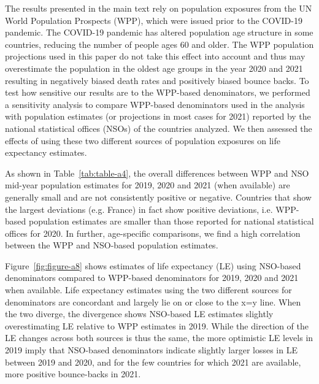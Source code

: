 \documentclass[12pt]{article}
\begin{document}
The results presented in the main text rely on population exposures from the UN World Population Prospects (WPP), which were issued prior to the COVID-19 pandemic. The COVID-19 pandemic has altered population age structure in some countries, reducing the number of people ages 60 and older. The WPP population projections used in this paper do not take this effect into account and thus may overestimate the population in the oldest age groups in the year 2020 and 2021 resulting in negatively biased death rates and positively biased bounce backs. To test how sensitive our results are to the WPP-based denominators, we performed a sensitivity analysis to compare WPP-based denominators used in the analysis with population estimates (or projections in most cases for 2021) reported by the national statistical offices (NSOs) of the countries analyzed. We then assessed the effects of using these two different sources of population exposures on life expectancy estimates.

As shown in Table~\ref{tab:table-a4}, the overall differences between WPP and NSO mid-year population estimates for 2019, 2020 and 2021 (when available) are generally small and are not consistently positive or negative. Countries that show the largest deviations (e.g. France) in fact show positive deviations, i.e. WPP-based population estimates are smaller than those reported for national statistical offices for 2020. In further, age-specific comparisons, we find a high correlation between the WPP and NSO-based population estimates.

Figure~\ref{fig:figure-a8} shows estimates of life expectancy (LE) using NSO-based denominators compared to WPP-based denominators for 2019, 2020 and 2021 when available. Life expectancy estimates using the two different sources for denominators are concordant and largely lie on or close to the x=y line. When the two diverge, the divergence shows NSO-based LE estimates slightly overestimating LE relative to WPP estimates in 2019. While the direction of the LE changes across both sources is thus the same, the more optimistic LE levels in 2019 imply that NSO-based denominators indicate slightly larger losses in LE between 2019 and 2020, and for the few countries for which 2021 are available, more positive bounce-backs in 2021.
\end{document}
